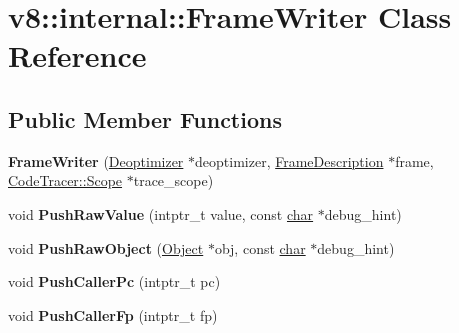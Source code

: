 \hypertarget{classv8_1_1internal_1_1FrameWriter}{}\section{v8\+:\+:internal\+:\+:Frame\+Writer Class Reference}
\label{classv8_1_1internal_1_1FrameWriter}
\subsection*{Public Member Functions}
\begin{DoxyCompactItemize}
\item 
\mbox{\label{classv8_1_1internal_1_1FrameWriter_a69ae1a4abaf21bf37898a483694acbea}} 
{\bfseries Frame\+Writer} (\mbox{\hyperlink{classv8_1_1internal_1_1Deoptimizer}{Deoptimizer}} $\ast$deoptimizer, \mbox{\hyperlink{classv8_1_1internal_1_1FrameDescription}{Frame\+Description}} $\ast$frame, \mbox{\hyperlink{classv8_1_1internal_1_1CodeTracer_1_1Scope}{Code\+Tracer\+::\+Scope}} $\ast$trace\+\_\+scope)
\item 
\mbox{\label{classv8_1_1internal_1_1FrameWriter_a21f0dd5c779f03fdb04b4f6dd6da0d35}} 
void {\bfseries Push\+Raw\+Value} (intptr\+\_\+t value, const \mbox{\hyperlink{classchar}{char}} $\ast$debug\+\_\+hint)
\item 
\mbox{\label{classv8_1_1internal_1_1FrameWriter_ab044050c19d4fab86e71723c75b8cb40}} 
void {\bfseries Push\+Raw\+Object} (\mbox{\hyperlink{classv8_1_1internal_1_1Object}{Object}} $\ast$obj, const \mbox{\hyperlink{classchar}{char}} $\ast$debug\+\_\+hint)
\item 
\mbox{\label{classv8_1_1internal_1_1FrameWriter_ade4d3a9ecca7e9360e2f4b1d91419234}} 
void {\bfseries Push\+Caller\+Pc} (intptr\+\_\+t pc)
\item 
\mbox{\label{classv8_1_1internal_1_1FrameWriter_ae02b3240575777950c4f85c0518028c5}} 
void {\bfseries Push\+Caller\+Fp} (intptr\+\_\+t fp)
\item 
\mbox{\label{classv8_1_1internal_1_1FrameWriter_a47162731e631d44fe3537371ea707e92}} 

\end{DoxyCompactItemize}
